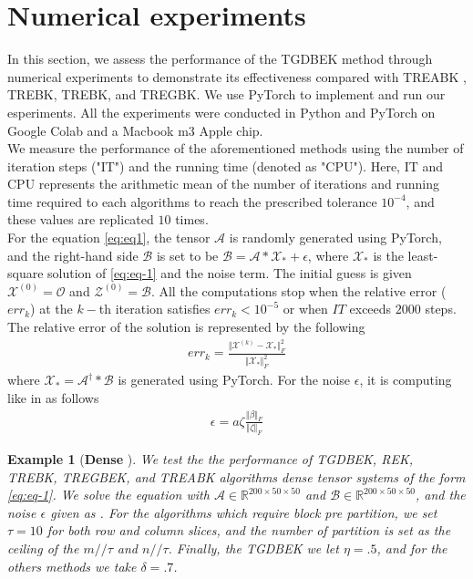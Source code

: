 \documentclass[11pt]{article}
\newtheorem{example}[theorem]{Example}
\def\fm#1{\mathcal{#1}}
\def\r{\mathbb{R}}
\def \x#1{\fm X^{(#1)}}
\begin{document}
\section{Numerical experiments} \label{sec:numexp}
In this section, we assess the  performance of  the TGDBEK method through numerical experiments to demonstrate its effectiveness compared with TREABK \cite{}, TREBK\cite{}, TREBK\cite{}, and TREGBK. We use  PyTorch \cite{ansel2025pytorch} to implement and run our esperiments. All the experiments were conducted in Python and PyTorch on  Google Colab and a Macbook m3 Apple chip.\\
We measure the performance of the aforementioned methods using the number of iteration steps ("IT") and the running time (denoted as "CPU"). Here, IT and CPU represents the arithmetic mean of the number of iterations and running time required to  each algorithms to reach the prescribed tolerance $10^{-4}$, and these values are replicated $10$ times. \\

For the equation \eqref{eq:eq1}, the tensor $\fm A$ is randomly generated using PyTorch, and the right-hand side $\fm B$ is set to be $\fm B= \fm A * \fm X_\ast + \fm \epsilon$, where $\fm X_\ast$ is the least-square solution of \eqref{eq:eq-1} and the noise term.  The initial guess is given $\x{0} = \fm O$ and $\fm Z^{(0)}=\fm B$. All the  computations stop when the relative error ($err_k$) at the $k-$th iteration satisfies $err_k < 10^{-5}$ or when $IT$ exceeds $2000$ steps. The relative error of the solution is represented by the following
\begin{align*}
    err_k = \frac{\Vert \x{k}-\fm X_\ast \Vert_F^2}{\Vert \fm X_\ast \Vert_F^2}
\end{align*}
where $\fm X_\ast = \fm A^\dagger * \fm B$ is generated using PyTorch. For the noise $\epsilon$, it is computing like in \cite{huang2024tensor} as follows
\begin{align}
    \epsilon = a  \zeta  \frac{\Vert \beta\Vert_F} {\Vert \zeta \Vert_F}
\end{align}

\begin{example}[\textbf{Dense }]
We test the  the performance of TGDBEK, REK, TREBK, TREGBEK, and TREABK algorithms  dense tensor systems of the form \eqref{eq:eq-1}. We solve the  equation  with $\fm A \in \r^{200\times 50 \times 50 }$  and $\fm B \in \r^{200\times 50\times 50 }$, and the noise  $\epsilon$ given as . For the algorithms which require block pre partition, we set  $\tau = 10$ for both row and column slices, and the number of partition is set as the ceiling of the $m// \tau$  and $n//\tau$. Finally,  the TGDBEK we let $\eta = .5$, and for the others methods we take $\delta =.7$.
\end{example}
\end{document}
